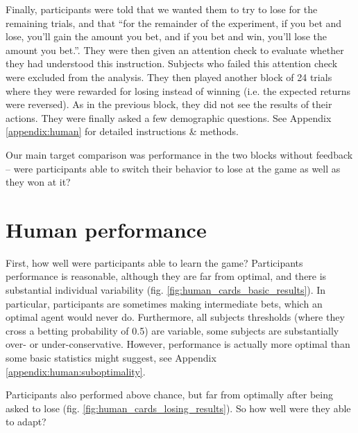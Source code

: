 Finally, participants were told that we wanted them to try to lose for the remaining trials, and that ``for the remainder of the experiment, if you bet and lose, you’ll gain the amount you bet, and if you bet and win, you’ll lose the amount you bet.''. They were then given an attention check to evaluate whether they had understood this instruction. Subjects who failed this attention check were excluded from the analysis. They then played another block of 24 trials where they were rewarded for losing instead of winning (i.e. the expected returns were reversed). As in the previous block, they did not see the results of their actions. They were finally asked a few demographic questions. See Appendix \ref{appendix:human} for detailed instructions \& methods.\par
Our main target comparison was performance in the two blocks without feedback -- were participants able to switch their behavior to lose at the game as well as they won at it?\par


\section{Human performance}
First, how well were participants able to learn the game? Participants performance is reasonable, although they are far from optimal, and there is substantial individual variability (fig. \ref{fig:human_cards_basic_results}). In particular, participants are sometimes making intermediate bets, which an optimal agent would never do. Furthermore, all subjects thresholds (where they cross a betting probability of 0.5) are variable, some subjects are substantially over- or under-conservative. However, performance is actually more optimal than some basic statistics might suggest, see Appendix \ref{appendix:human:suboptimality}. \par 
Participants also performed above chance, but far from optimally after being asked to lose (fig. \ref{fig:human_cards_losing_results}). So how well were they able to adapt? 

